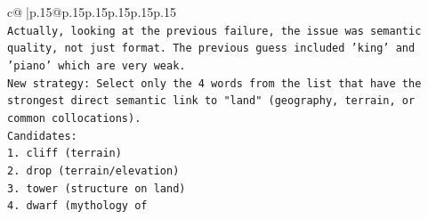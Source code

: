 \documentclass{article}
\begin{document}
{\begin{supertabular}{c@{$\;$}|p{.15\linewidth}@{}p{.15\linewidth}p{.15\linewidth}p{.15\linewidth}p{.15\linewidth}p{.15\linewidth}}
{{{\\ 
\texttt{Actually, looking at the previous failure, the issue was semantic quality, not just format. The previous guess included 'king' and 'piano' which are very weak.} \\
\texttt{New strategy: Select only the 4 words from the list that have the strongest direct semantic link to "land" (geography, terrain, or common collocations).} \\
\texttt{Candidates:} \\
\texttt{1. cliff (terrain)} \\
\texttt{2. drop (terrain/elevation)} \\
\texttt{3. tower (structure on land)} \\
\texttt{4. dwarf (mythology of} \\
            }
        }
    }
     \\ \\

\end{supertabular}
}
\end{document}
